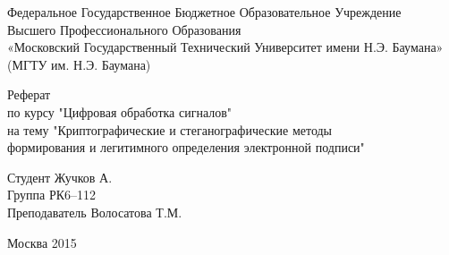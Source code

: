 \begin{titlepage}
\begin{center}
Федеральное Государственное Бюджетное Образовательное Учреждение \\ Высшего Профессионального Образования \\«Московский Государственный Технический Университет имени Н.Э. Баумана» (МГТУ им. Н.Э. Баумана)
\end{center} 
\vfill
{\large \begin{center}
{\Large Реферат} \\по курсу 
"Цифровая обработка сигналов" \\
на тему 
 "Криптографические и стеганографические методы\\ формирования
 и легитимного определения электронной подписи"
\end{center}}
\vfill
\begin{flushright}
Студент Жучков А.\\
  Группа РК6–112\\
Преподаватель Волосатова Т.М.
\end{flushright}
\vfill
\centering Москва 2015
\end{titlepage}